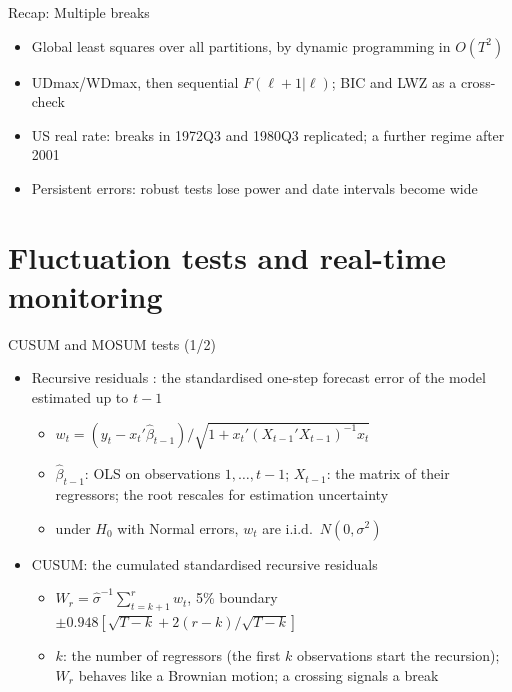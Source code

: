 \begin{frame}{Recap: Multiple breaks}
\itemsize{\small}
\begin{itemize}
    \item Global least squares over all partitions, by dynamic programming in $O(T^2)$
    \item UDmax/WDmax, then sequential $F(\ell + 1|\ell)$; BIC and LWZ as a cross-check
    \item US real rate: breaks in 1972Q3 and 1980Q3 replicated; a further regime after 2001
    \item Persistent errors: robust tests lose power and date intervals become wide
\end{itemize}
\end{frame}


\section{Fluctuation tests and real-time monitoring}

\begin{frame}{CUSUM and MOSUM tests (1/2)}
\itemsize{\small}
\begin{itemize}
    \item Recursive residuals : the standardised one-step forecast error of the model estimated up to $t - 1$
    \begin{itemize}
        \item $w_t = (y_t - x_t'\hat\beta_{t-1})/\sqrt{1 + x_t'(X_{t-1}'X_{t-1})^{-1}x_t}$
        \item $\hat\beta_{t-1}$: OLS on observations $1, \dots, t - 1$; $X_{t-1}$: the matrix of their regressors; the root rescales for estimation uncertainty
        \item under $H_0$ with Normal errors, $w_t$ are i.i.d.\ $N(0, \sigma^2)$
    \end{itemize}
    \item CUSUM: the cumulated standardised recursive residuals
    \begin{itemize}
        \item $W_r = \hat\sigma^{-1}\sum_{t = k+1}^{r} w_t$, 5\% boundary $\pm 0.948[\sqrt{T - k} + 2(r - k)/\sqrt{T - k}]$
        \item $k$: the number of regressors (the first $k$ observations start the recursion); $W_r$ behaves like a Brownian motion; a crossing signals a break
    \end{itemize}
\end{itemize}
\end{frame}

